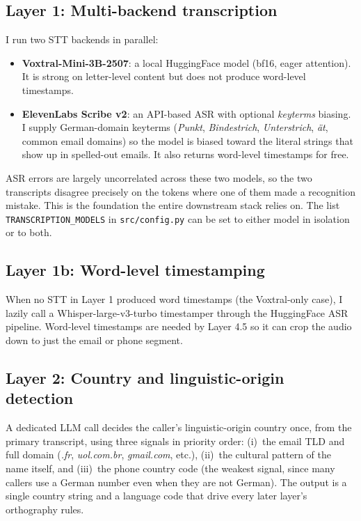 \documentclass[11pt,a4paper]{article}
\begin{document}


\subsection{Layer 1: Multi-backend transcription}\label{sec:m_l1}

I run two STT backends in parallel:

\begin{itemize}
\item \textbf{Voxtral-Mini-3B-2507}: a local HuggingFace model
(bf16, eager attention). It is strong on letter-level content but
does not produce word-level timestamps.
\item \textbf{ElevenLabs Scribe v2}: an API-based ASR with optional
\textit{keyterms} biasing. I supply German-domain keyterms
(\textit{Punkt}, \textit{Bindestrich}, \textit{Unterstrich},
\textit{\"at}, common email domains) so the model is biased toward
the literal strings that show up in spelled-out emails. It also
returns word-level timestamps for free.
\end{itemize}

ASR errors are largely uncorrelated across these two models, so the
two transcripts disagree precisely on the tokens where one of them
made a recognition mistake. This is the foundation the entire
downstream stack relies on. The list \verb|TRANSCRIPTION_MODELS| in
\verb|src/config.py| can be set to either model in isolation or to
both.

\subsection{Layer 1b: Word-level timestamping}\label{sec:m_l1b}

When no STT in Layer 1 produced word timestamps (the Voxtral-only
case), I lazily call a Whisper-large-v3-turbo timestamper through
the HuggingFace ASR pipeline. Word-level timestamps are needed by
Layer 4.5 so it can crop the audio down to just the email or phone
segment.

\subsection{Layer 2: Country and linguistic-origin detection}\label{sec:m_l2}

A dedicated LLM call decides the caller's linguistic-origin country
once, from the primary transcript, using three signals in priority
order: (i)~the email TLD and full domain (\textit{.fr},
\textit{uol.com.br}, \textit{gmail.com}, etc.), (ii)~the cultural
pattern of the name itself, and (iii)~the phone country code (the
weakest signal, since many callers use a German number even when
they are not German). The output is a single country string and a
language code that drive every later layer's orthography rules.
\end{document}
